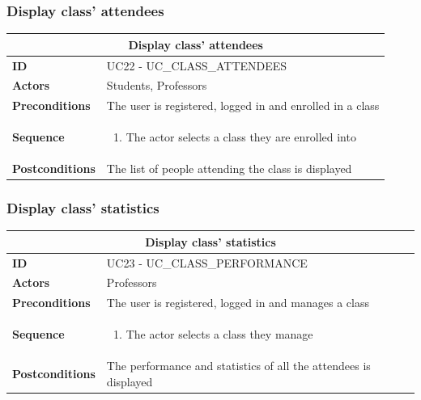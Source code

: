 \subsubsection{Display class’ attendees}
\begin{tabular}{|m{2.5cm}|m{8cm}|}
	\hline
	\multicolumn{2}{|c|}{Display class’ attendees} \\
	\hline
	\textbf{ID} & UC22 - UC\_CLASS\_ATTENDEES \\
	\hline
	\textbf{Actors} & Students, Professors \\
	\hline
	\textbf{Preconditions} & The user is registered, logged in and enrolled in a class \\
	\hline
	\textbf{Sequence} & 
	\begin{enumerate}
		\item The actor selects a class they are enrolled into
	\end{enumerate} \\
	\hline
	\textbf{Postconditions} & The list of people attending the class is displayed \\
	\hline
\end{tabular}

\subsubsection{Display class’ statistics}
\begin{tabular}{|m{2.5cm}|m{8cm}|}
	\hline
	\multicolumn{2}{|c|}{Display class’ statistics} \\
	\hline
	\textbf{ID} & UC23 - UC\_CLASS\_PERFORMANCE \\
	\hline
	\textbf{Actors} & Professors \\
	\hline
	\textbf{Preconditions} & The user is registered, logged in and manages a class \\
	\hline
	\textbf{Sequence} & 
	\begin{enumerate}
		\item The actor selects a class they manage
	\end{enumerate} \\
	\hline
	\textbf{Postconditions} & The performance and statistics of all the attendees is displayed \\
	\hline
\end{tabular}

